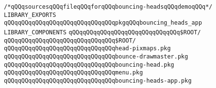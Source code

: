 \label{src/lib/x-kit/tut/bouncing-heads/bouncing-heads-app.lib}
\verb|/*qQQqsourcesqQQqfileqQQqforqQQqbouncing-headsqQQqdemoqQQq*/|\newline
\newline
\verb|LIBRARY_EXPORTS|\newline
\newline
\verb|qQQqqQQqqQQqqQQqqQQqqQQqqQQqqQQqpkgqQQqbouncing_heads_app|\newline
\newline
\verb|LIBRARY_COMPONENTS|\newline
\newline
\verb|qQQqqQQqqQQqqQQqqQQqqQQqqQQqqQQq$ROOT/|\newline
\verb|qQQqqQQqqQQqqQQqqQQqqQQqqQQqqQQq$ROOT/|\newline
\newline
\verb|qQQqqQQqqQQqqQQqqQQqqQQqqQQqqQQqhead-pixmaps.pkg|\newline
\verb|qQQqqQQqqQQqqQQqqQQqqQQqqQQqqQQqbounce-drawmaster.pkg|\newline
\verb|qQQqqQQqqQQqqQQqqQQqqQQqqQQqqQQqbouncing-head.pkg|\newline
\verb|qQQqqQQqqQQqqQQqqQQqqQQqqQQqqQQqmenu.pkg|\newline
\verb|qQQqqQQqqQQqqQQqqQQqqQQqqQQqqQQqbouncing-heads-app.pkg|\newline

